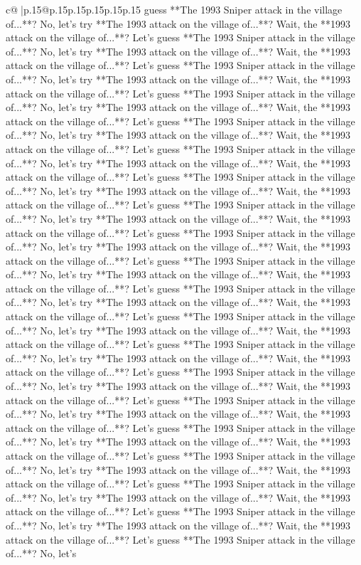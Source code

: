 \documentclass{article}
\begin{document}
{\begin{supertabular}{c@{$\;$}|p{.15\linewidth}@{}p{.15\linewidth}p{.15\linewidth}p{.15\linewidth}p{.15\linewidth}p{.15\linewidth}}
{{{guess **The 1993 Sniper attack in the village of...**? No, let's try **The 1993 attack on the village of...**? Wait, the **1993 attack on the village of...**? Let's guess **The 1993 Sniper attack in the village of...**? No, let's try **The 1993 attack on the village of...**? Wait, the **1993 attack on the village of...**? Let's guess **The 1993 Sniper attack in the village of...**? No, let's try **The 1993 attack on the village of...**? Wait, the **1993 attack on the village of...**? Let's guess **The 1993 Sniper attack in the village of...**? No, let's try **The 1993 attack on the village of...**? Wait, the **1993 attack on the village of...**? Let's guess **The 1993 Sniper attack in the village of...**? No, let's try **The 1993 attack on the village of...**? Wait, the **1993 attack on the village of...**? Let's guess **The 1993 Sniper attack in the village of...**? No, let's try **The 1993 attack on the village of...**? Wait, the **1993 attack on the village of...**? Let's guess **The 1993 Sniper attack in the village of...**? No, let's try **The 1993 attack on the village of...**? Wait, the **1993 attack on the village of...**? Let's guess **The 1993 Sniper attack in the village of...**? No, let's try **The 1993 attack on the village of...**? Wait, the **1993 attack on the village of...**? Let's guess **The 1993 Sniper attack in the village of...**? No, let's try **The 1993 attack on the village of...**? Wait, the **1993 attack on the village of...**? Let's guess **The 1993 Sniper attack in the village of...**? No, let's try **The 1993 attack on the village of...**? Wait, the **1993 attack on the village of...**? Let's guess **The 1993 Sniper attack in the village of...**? No, let's try **The 1993 attack on the village of...**? Wait, the **1993 attack on the village of...**? Let's guess **The 1993 Sniper attack in the village of...**? No, let's try **The 1993 attack on the village of...**? Wait, the **1993 attack on the village of...**? Let's guess **The 1993 Sniper attack in the village of...**? No, let's try **The 1993 attack on the village of...**? Wait, the **1993 attack on the village of...**? Let's guess **The 1993 Sniper attack in the village of...**? No, let's try **The 1993 attack on the village of...**? Wait, the **1993 attack on the village of...**? Let's guess **The 1993 Sniper attack in the village of...**? No, let's try **The 1993 attack on the village of...**? Wait, the **1993 attack on the village of...**? Let's guess **The 1993 Sniper attack in the village of...**? No, let's try **The 1993 attack on the village of...**? Wait, the **1993 attack on the village of...**? Let's guess **The 1993 Sniper attack in the village of...**? No, let's try **The 1993 attack on the village of...**? Wait, the **1993 attack on the village of...**? Let's guess **The 1993 Sniper attack in the village of...**? No, let's try **The 1993 attack on the village of...**? Wait, the **1993 attack on the village of...**? Let's guess **The 1993 Sniper attack in the village of...**? No, let's try **The 1993 attack on the village of...**? Wait, the **1993 attack on the village of...**? Let's guess **The 1993 Sniper attack in the village of...**? No, let's }}}
\end{supertabular}}
\end{document}
